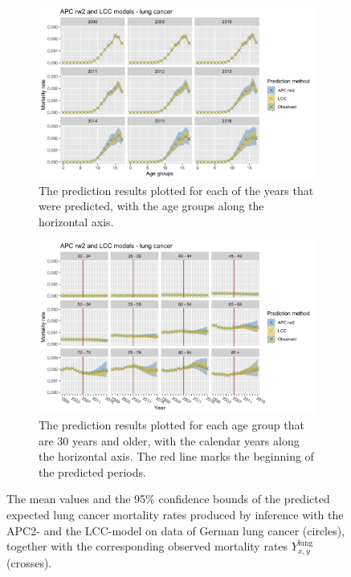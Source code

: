 \begin{figure}[h!]
    \centering
    \begin{subfigure}[b]{.75\linewidth}
        \includegraphics[width=\linewidth]{real-data/real-data-univariate/Figures/univariate-comparison-by-age-lung.png}
        \caption{The prediction results plotted for each of the years that were predicted, with the age groups along the horizontal axis.}
        \label{fig:uv-comparison-lung-top}
    \end{subfigure}
    
    \begin{subfigure}[b]{.75\linewidth}
        \includegraphics[width=\linewidth]{real-data/real-data-univariate/Figures/univariate-comparison-by-period-lung.png}
        \caption{The prediction results plotted for each age group that are 30 years and older, with the calendar years along the horizontal axis. The red line marks the beginning of the predicted periods.}
        \label{fig:uv-comparison-lung-bottom}
    \end{subfigure}
    \caption{The mean values and the 95\% confidence bounds of the predicted expected lung cancer mortality rates produced by inference with the APC2- and the LCC-model on data of German lung cancer (circles), together with the corresponding observed mortality rates $Y_{x,y}^{\text{lung}}$ (crosses).}
    \label{fig:uv-comparison-lung}
\end{figure}

